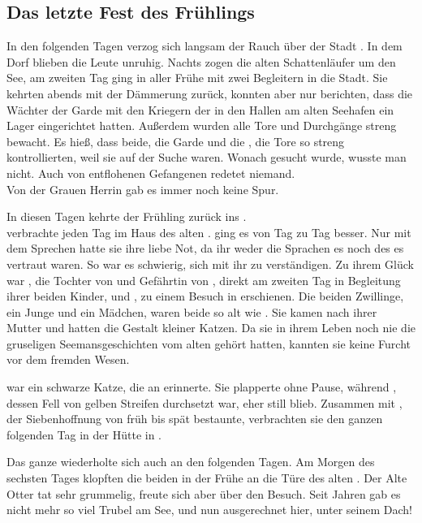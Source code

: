\begin{Large}
\chapter{Das letzte Fest des Frühlings}
In den folgenden Tagen verzog sich langsam der Rauch über der Stadt {\Tern}. In dem Dorf {\Berna} blieben die Leute unruhig. Nachts zogen die alten Schattenläufer um den See, am zweiten Tag ging in aller Frühe {\Nox} mit zwei Begleitern in die Stadt. Sie kehrten abends mit der Dämmerung zurück, konnten aber nur berichten, dass die Wächter der Garde mit den Kriegern der {\Bangiri} in den Hallen am alten Seehafen ein Lager eingerichtet hatten. Außerdem wurden alle Tore und Durchgänge streng bewacht. Es hieß, dass beide, die Garde und die {\Bangiri}, die Tore so streng kontrollierten, weil sie auf der Suche waren. Wonach gesucht wurde, wusste man nicht. Auch von entflohenen Gefangenen redetet niemand.\\
Von der Grauen Herrin gab es immer noch keine Spur. 

In diesen Tagen kehrte der Frühling zurück ins {\Enland}.\\
{\Salbana} verbrachte jeden Tag im Haus des alten {\Marn}. {\Sepa} ging es von Tag zu Tag besser. Nur mit dem Sprechen hatte sie ihre liebe Not, da ihr weder die Sprachen {\Rhinland}es noch des {\Enland}es vertraut waren. So war es schwierig, sich mit ihr zu verständigen. Zu ihrem Glück war {\Mena}, die Tochter von {\Eno} und Gefährtin von {\Nox}, direkt am zweiten Tag in Begleitung ihrer beiden Kinder, {\Enno} und {\Ena}, zu einem Besuch in {\AltBerna} erschienen. Die beiden Zwillinge, ein Junge und ein Mädchen, waren beide so alt wie {\Sepa}. Sie kamen nach ihrer Mutter und hatten die Gestalt kleiner Katzen. Da sie in ihrem Leben noch nie die gruseligen Seemansgeschichten vom alten {\Marn} gehört hatten, kannten sie keine Furcht vor dem fremden Wesen.

{\Ena} war ein schwarze Katze, die an {\Eno} erinnerte. Sie plapperte ohne Pause, während {\Enno}, dessen Fell von gelben Streifen durchsetzt war, eher still blieb. Zusammen mit {\Piedo}, der Siebenhoffnung von früh bis spät bestaunte, verbrachten sie den ganzen folgenden Tag in der Hütte in {\AltBerna}. 

Das ganze wiederholte sich auch an den folgenden Tagen. Am Morgen des sechsten Tages klopften die beiden in der Frühe an die Türe des alten {\Marn}. Der Alte Otter {\Marn} tat sehr grummelig, freute sich aber über den Besuch. Seit Jahren gab es nicht mehr so viel Trubel am See, und nun ausgerechnet hier, unter seinem Dach!


\end{Large}
